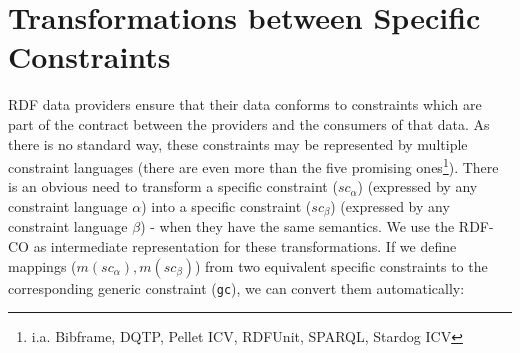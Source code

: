 \documentclass{llncs}
\newcommand{\ms}[1]{\texttt{#1}}
\newenvironment{DL}{
  \vspace{0cm}
	\begin{center}
  \begin{tabular}{r l}

}{
  \end{tabular}
	\end{center}
}
\begin{document}
%
%
%

\section{Transformations between Specific Constraints}
\label{sec:transformations}

RDF data providers ensure that their data conforms to constraints which are part of the contract between the providers and the consumers of that data.
As there is no standard way, these constraints may be represented by multiple constraint languages (there are even more than the five promising ones\footnote{i.a. Bibframe, DQTP, Pellet ICV, RDFUnit, SPARQL, Stardog ICV}).
There is an obvious need to transform a specific constraint (\ms{$sc_{\alpha}$}) (expressed by any constraint language \ms{$\alpha$}) into a specific constraint (\ms{$sc_{\beta}$}) (expressed by any constraint language \ms{$\beta$}) - when they have the same semantics.
We use the RDF-CO as intermediate representation for these transformations.
If we define mappings ($m(sc_{\alpha}), m(sc_{\beta})$) from two equivalent specific constraints to the corresponding generic constraint (\ms{gc}),
we can convert them automatically:
\end{document}

